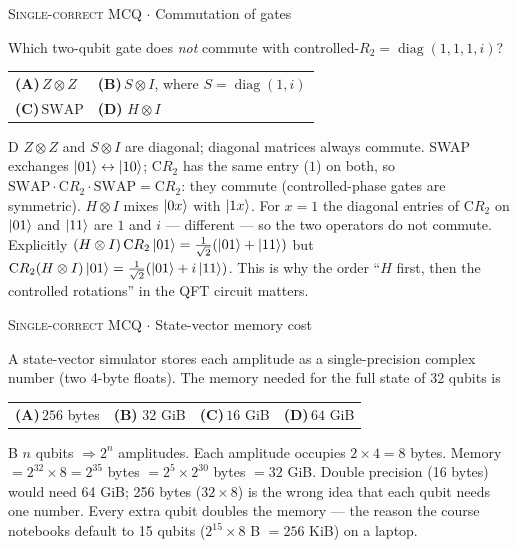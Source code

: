 \documentclass[11pt,a4paper]{article}
\newcommand{\optlabel}[1]{\textbf{(#1)}}
\newcommand{\correctlabel}[1]{\textcolor{okgreen}{\textbf{(#1)}\,\ding{51}}}
\newenvironment{qitem}[1]{\begin{list}{}{\setlength{\leftmargin}{3.3em}\setlength{\labelwidth}{3.1em}%
  \setlength{\labelsep}{0.2em}\setlength{\topsep}{3pt}\setlength{\parsep}{3pt}}\item[\textbf{Q.#1}\hfill]}{\end{list}}
\newcommand{\qsep}{\par\vspace{2pt}{\color{black!15}\hrule}\vspace{4pt}}
\newcommand{\qmeta}[2]{{\footnotesize\color{black!60}\textsc{#1} \;$\cdot$\; #2}\par}
\begin{document}
\begin{qitem}{31}
\qmeta{Single-correct MCQ}{Commutation of gates}
Which two-qubit gate does \emph{not} commute with controlled-$R_2 = \operatorname{diag}(1, 1, 1, i)$?
\par\smallskip\noindent\begin{tabularx}{\linewidth}{@{}*{2}{L}@{}}
\optlabel{A}\,$Z\otimes Z$ & \optlabel{B}\,$S\otimes I$, where $S = \operatorname{diag}(1, i)$ \\[3pt]
\optlabel{C}\,$\mathrm{SWAP}$ & \correctlabel{D}\,$H\otimes I$
\end{tabularx}
\end{qitem}
\begin{solbox}{D}
$Z\otimes Z$ and $S \otimes I$ are diagonal; diagonal matrices always commute.
SWAP exchanges $\ket{01} \leftrightarrow \ket{10}$; $\mathrm{C}R_2$ has the same entry ($1$) on both, so
$\mathrm{SWAP}\cdot\mathrm{C}R_2\cdot\mathrm{SWAP} = \mathrm{C}R_2$: they commute (controlled-phase gates are symmetric).
$H\otimes I$ mixes $\ket{0x}$ with $\ket{1x}$. For $x = 1$ the diagonal entries of $\mathrm{C}R_2$ on $\ket{01}$ and $\ket{11}$ are
$1$ and $i$ --- different --- so the two operators do not commute. Explicitly
$(H\otimes I)\,\mathrm{C}R_2\ket{01} = \frac{1}{\sqrt2}(\ket{01} + \ket{11})$ but $\mathrm{C}R_2(H\otimes I)\ket{01} = \frac{1}{\sqrt2}(\ket{01} + i\ket{11})$.
This is why the order ``$H$ first, then the controlled rotations'' in the QFT circuit matters.
\end{solbox}
\qsep

\begin{qitem}{32}
\qmeta{Single-correct MCQ}{State-vector memory cost}
A state-vector simulator stores each amplitude as a single-precision complex number (two 4-byte floats).
The memory needed for the full state of $32$ qubits is
\par\smallskip\noindent\begin{tabularx}{\linewidth}{@{}*{4}{L}@{}}
\optlabel{A}\,$256$ bytes & \correctlabel{B}\,$32$ GiB & \optlabel{C}\,$16$ GiB & \optlabel{D}\,$64$ GiB
\end{tabularx}
\end{qitem}
\begin{solbox}{B}
$n$ qubits $\Rightarrow 2^n$ amplitudes. Each amplitude occupies $2 \times 4 = 8$ bytes. Memory $= 2^{32}\times 8 = 2^{35}$ bytes
$= 2^{5}\times 2^{30}$ bytes $= 32$ GiB. Double precision (16 bytes) would need 64 GiB; 256 bytes ($32\times8$) is the
wrong idea that each qubit needs one number. Every extra qubit doubles the memory --- the reason the course notebooks
default to 15 qubits ($2^{15}\times 8$ B $= 256$ KiB) on a laptop.
\end{solbox}
\qsep
\end{document}
